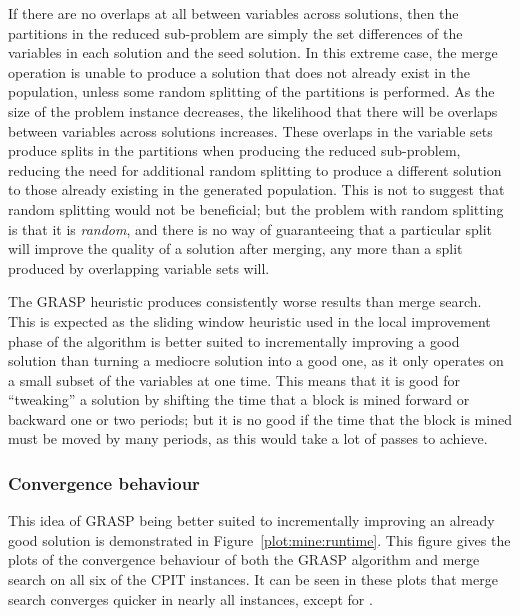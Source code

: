 \documentclass[journal]{IEEEtran}
\begin{document}
If there are no overlaps at all between variables across solutions, then the partitions in the reduced sub-problem are simply the set differences of the variables in each solution and the seed solution. In this extreme case, the merge operation is unable to produce a solution that does not already exist in the population, unless some random splitting of the partitions is performed. As the size of the problem instance decreases, the likelihood that there will be overlaps between variables across solutions increases. These overlaps in the variable sets produce splits in the partitions when producing the reduced sub-problem, reducing the need for additional random splitting to produce a different solution to those already existing in the generated population. This is not to suggest that random splitting would not be beneficial; but the problem with random splitting is that it is \emph{random}, and there is no way of guaranteeing that a particular split will improve the quality of a solution after merging, any more than a split produced by overlapping variable sets will.

The GRASP heuristic produces consistently worse results than merge search. This is expected as the sliding window heuristic used in the local improvement phase of the algorithm is better suited to incrementally improving a good solution than turning a mediocre solution into a good one, as it only operates on a small subset of the variables at one time. This means that it is good for ``tweaking'' a solution by shifting the time that a block is mined forward or backward one or two periods; but it is no good if the time that the block is mined must be moved by many periods, as this would take a lot of passes to achieve.

\subsubsection*{\textbf{Convergence behaviour}}

This idea of GRASP being better suited to incrementally improving an already good solution is demonstrated in Figure~\ref{plot:mine:runtime}. This figure gives the plots of the convergence behaviour of both the GRASP algorithm and merge search on all six of the CPIT instances. It can be seen in these plots that merge search converges quicker in nearly all instances, except for \dmine{}. 
\end{document}
